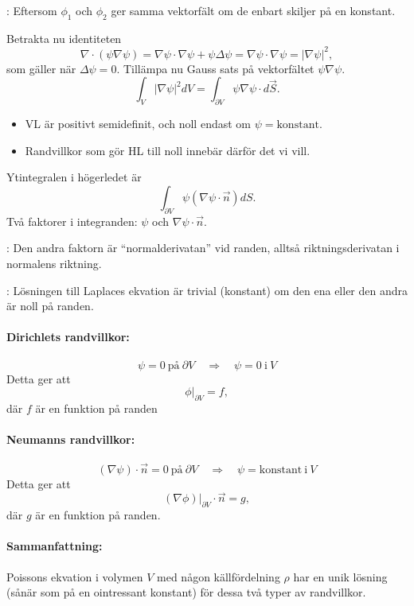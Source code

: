 \documentclass[%
oneside,                 %
final,                   %
10pt]{article}
\newcommand{\shortinlinecomment}[3]{{\color{red}{\bf #1}: #2}}
\begin{document}
\noindent
\shortinlinecomment{Comment 8}{ Eftersom $\phi_1$ och $\phi_2$ ger samma vektorfält om de enbart skiljer på en konstant. }{ Eftersom $\phi_1$ och $\phi_2$ }

Betrakta nu identiteten
$$
\nabla\cdot(\psi\nabla\psi)=\nabla\psi\cdot\nabla\psi+\psi\Delta\psi
=\nabla\psi\cdot\nabla\psi=|\nabla\psi|^2,
$$
som gäller när $\Delta\psi=0$. Tillämpa nu Gauss sats på vektorfältet $\psi\nabla\psi$. 
$$
\int_V|\nabla\psi|^2dV=\int_{\partial V}\psi\nabla\psi\cdot d\vec S.
$$
\begin{itemize}
\item VL är positivt semidefinit, och noll endast om $\psi = \mathrm{konstant}$. 

\item Randvillkor som gör HL till noll innebär därför det vi vill.
\end{itemize}

\noindent
Ytintegralen i högerledet är 
$$
\int_{\partial V}\psi(\nabla\psi\cdot\vec n)dS.
$$ 
Två faktorer i integranden: $\psi$ och $\nabla\psi\cdot\vec n$. 

\shortinlinecomment{Comment 9}{ Den andra faktorn är ``normalderivatan'' vid randen, alltså riktningsderivatan i normalens riktning. }{ Den andra faktorn är }

\shortinlinecomment{Comment 10}{ Lösningen till Laplaces ekvation är trivial (konstant) om den ena eller den andra är noll på randen. }{ Lösningen till Laplaces ekvation }

\paragraph{Dirichlets randvillkor:}
$$
\psi = 0 \mathrm{~på~} \partial V \quad \Rightarrow \quad \psi = 0 \mathrm{~i~} V
$$
Detta ger att
$$
\phi|_{\partial V}=f,
$$
där $f$ är en funktion på randen

\paragraph{Neumanns randvillkor:}
$$
(\nabla\psi) \cdot \vec n=0 \mathrm{~på~} \partial V \quad \Rightarrow \quad \psi = \mathrm{konstant} \mathrm{~i~} V
$$
Detta ger att
$$
(\nabla\phi)|_{\partial V}\cdot\vec n=g,
$$
där $g$ är en funktion på randen. 

\paragraph{Sammanfattning:}
Poissons ekvation i volymen $V$ med någon källfördelning $\rho$ har en unik lösning (sånär
som på en ointressant konstant) för dessa två typer av randvillkor.



\printindex
\end{document}
